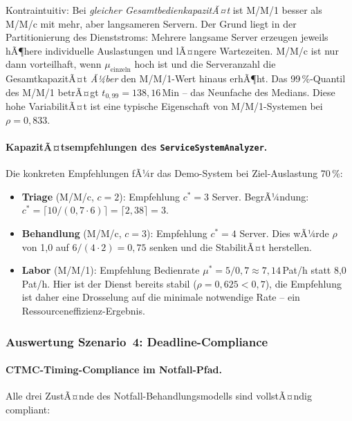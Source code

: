 ﻿\documentclass[a4paper,12pt]{scrreprt}
\theoremstyle{definition}
\begin{document}
Kontraintuitiv: Bei \emph{gleicher GesamtbedienkapazitÃ¤t} ist M/M/1 besser
als M/M/c mit mehr, aber langsameren Servern. Der Grund liegt in der
Partitionierung des Dienststroms: Mehrere langsame Server erzeugen
jeweils hÃ¶here individuelle Auslastungen und lÃ¤ngere Wartezeiten.
M/M/c ist nur dann vorteilhaft, wenn $\mu_\text{einzeln}$ hoch ist und
die Serveranzahl die GesamtkapazitÃ¤t \emph{Ã¼ber} den M/M/1-Wert hinaus
erhÃ¶ht. Das 99\,\%-Quantil des M/M/1 betrÃ¤gt $t_{0{,}99} = 138{,}16$\,Min
-- das Neunfache des Medians. Diese hohe VariabilitÃ¤t ist eine typische
Eigenschaft von M/M/1-Systemen bei $\rho = 0{,}833$.

\paragraph{KapazitÃ¤tsempfehlungen des \texttt{ServiceSystemAnalyzer}.}
Die konkreten Empfehlungen fÃ¼r das Demo-System bei Ziel-Auslastung 70\,\%:
\begin{itemize}
	\item[-] \textbf{Triage} (M/M/c, $c=2$): Empfehlung $c^* = 3$ Server.
	BegrÃ¼ndung: $c^* = \lceil 10/(0{,}7 \cdot 6) \rceil = \lceil 2{,}38 \rceil = 3$.
	\item[-] \textbf{Behandlung} (M/M/c, $c=3$): Empfehlung $c^* = 4$ Server.
	Dies wÃ¼rde $\rho$ von 1{,}0 auf $6/(4 \cdot 2) = 0{,}75$ senken und
	die StabilitÃ¤t herstellen.
	\item[-] \textbf{Labor} (M/M/1): Empfehlung Bedienrate
	$\mu^* = 5/0{,}7 \approx 7{,}14$\,Pat/h statt 8{,}0\,Pat/h.
	Hier ist der Dienst bereits stabil ($\rho = 0{,}625 < 0{,}7$),
	die Empfehlung ist daher eine Drosselung auf die minimale
	notwendige Rate -- ein Ressourceneffizienz-Ergebnis.
\end{itemize}

\subsubsection{Auswertung Szenario~4: Deadline-Compliance}

\paragraph{CTMC-Timing-Compliance im Notfall-Pfad.}
Alle drei ZustÃ¤nde des Notfall-Behand\-lungsmodells sind vollstÃ¤ndig compliant:
\end{document}
